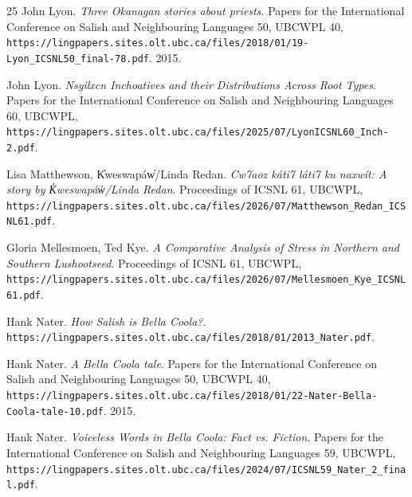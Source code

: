 \begin{thebibliography}{25}
John Lyon. \emph{Three Okanagan stories about priests}. Papers for the International Conference on Salish and Neighbouring Languages 50, UBCWPL 40, \texttt{https:/\allowbreak{}/\allowbreak{}lingpapers.sites.olt.ubc.ca/\allowbreak{}files/\allowbreak{}2018/\allowbreak{}01/\allowbreak{}19-Lyon\_\allowbreak{}ICSNL50\_\allowbreak{}final-78.pdf}. 2015.

John Lyon. \emph{Nsyilxcn Inchoatives and their Distributions Across Root Types}. Papers for the International Conference on Salish and Neighbouring Languages 60, UBCWPL, \texttt{https:/\allowbreak{}/\allowbreak{}lingpapers.sites.olt.ubc.ca/\allowbreak{}files/\allowbreak{}2025/\allowbreak{}07/\allowbreak{}LyonICSNL60\_\allowbreak{}Inch-2.pdf}.

Lisa Matthewson, K̓weswapáw̓/Linda Redan. \emph{Cw7aoz káti7 láti7 ku naxwít: A story by K̓weswapáw̓/Linda Redan}. Proceedings of ICSNL 61, UBCWPL, \texttt{https:/\allowbreak{}/\allowbreak{}lingpapers.sites.olt.ubc.ca/\allowbreak{}files/\allowbreak{}2026/\allowbreak{}07/\allowbreak{}Matthewson\_\allowbreak{}Redan\_\allowbreak{}ICSNL61.pdf}.

Gloria Mellesmoen, Ted Kye. \emph{A Comparative Analysis of Stress in Northern and Southern Lushootseed}. Proceedings of ICSNL 61, UBCWPL, \texttt{https:/\allowbreak{}/\allowbreak{}lingpapers.sites.olt.ubc.ca/\allowbreak{}files/\allowbreak{}2026/\allowbreak{}07/\allowbreak{}Mellesmoen\_\allowbreak{}Kye\_\allowbreak{}ICSNL61.pdf}.

Hank Nater. \emph{How Salish is Bella Coola?}. \texttt{https:/\allowbreak{}/\allowbreak{}lingpapers.sites.olt.ubc.ca/\allowbreak{}files/\allowbreak{}2018/\allowbreak{}01/\allowbreak{}2013\_\allowbreak{}Nater.pdf}.

Hank Nater. \emph{A Bella Coola tale}. Papers for the International Conference on Salish and Neighbouring Languages 50, UBCWPL 40, \texttt{https:/\allowbreak{}/\allowbreak{}lingpapers.sites.olt.ubc.ca/\allowbreak{}files/\allowbreak{}2018/\allowbreak{}01/\allowbreak{}22-Nater-Bella-Coola-tale-10.pdf}. 2015.

Hank Nater. \emph{Voiceless Words in Bella Coola: Fact vs. Fiction}. Papers for the International Conference on Salish and Neighbouring Languages 59, UBCWPL, \texttt{https:/\allowbreak{}/\allowbreak{}lingpapers.sites.olt.ubc.ca/\allowbreak{}files/\allowbreak{}2024/\allowbreak{}07/\allowbreak{}ICSNL59\_\allowbreak{}Nater\_\allowbreak{}2\_\allowbreak{}final.pdf}.


\end{thebibliography}
